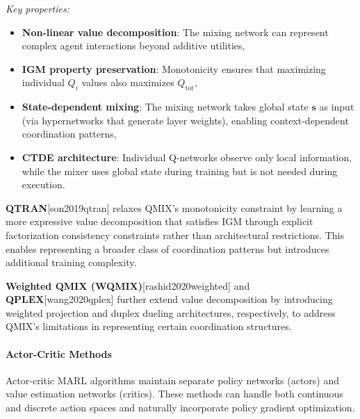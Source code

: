 \textit{Key properties:}
\begin{itemize}
    \item \textbf{Non-linear value decomposition}: The mixing network can represent complex agent interactions beyond additive utilities,
    \item \textbf{IGM property preservation}: Monotonicity ensures that maximizing individual $Q_i$ values also maximizes $Q_{\text{tot}}$,
    \item \textbf{State-dependent mixing}: The mixing network takes global state $\mathbf{s}$ as input (via hypernetworks that generate layer weights), enabling context-dependent coordination patterns,
    \item \textbf{CTDE architecture}: Individual Q-networks observe only local information, while the mixer uses global state during training but is not needed during execution.
\end{itemize}

\textbf{QTRAN}[son2019qtran] relaxes QMIX's monotonicity constraint by learning a more expressive value decomposition that satisfies IGM through explicit factorization consistency constraints rather than architectural restrictions. This enables representing a broader class of coordination patterns but introduces additional training complexity.

\textbf{Weighted QMIX (WQMIX)}[rashid2020weighted] and \textbf{QPLEX}[wang2020qplex] further extend value decomposition by introducing weighted projection and duplex dueling architectures, respectively, to address QMIX's limitations in representing certain coordination structures.

\paragraph{Actor-Critic Methods}
\label{sec:marl_actor_critic}

Actor-critic MARL algorithms maintain separate policy networks (actors) and value estimation networks (critics). These methods can handle both continuous and discrete action spaces and naturally incorporate policy gradient optimization.

